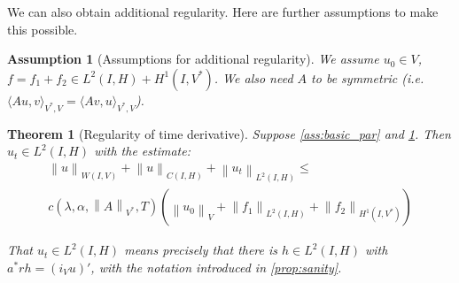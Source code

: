 \documentclass[english,a4paper,10pt,oneside]{scrbook}	%
\theoremstyle{break}
\newtheorem{thm}[equation]{Theorem}
\newtheorem{ass}[equation]{Assumption}
\theoremstyle{remark}
\newcommand{\norm}[1]{\left\lVert#1\right\rVert}
\newcommand{\VN}[1]{\norm{#1}_{V}}
\newcommand{\VSN}[1]{\norm{#1}_{V^*}}
\begin{document}
We can also obtain additional regularity. Here are further assumptions to make this possible.

\begin{ass}[Assumptions for additional regularity]
\label{ass:reg_par}
We assume $u_0 \in V$, $f = f_1+f_2 \in L^2(I,H)+H^1(I,V^*)$. We also need $A$ to be symmetric (i.e. $\langle Au,v \rangle_{V^*,V} = \langle Av,u \rangle_{V^*,V}$).
\end{ass}

\begin{thm}[Regularity of time derivative]
\label{thm:reg_time}
Suppose \cref{ass:basic_par} and \cref{ass:reg_par}. Then $u_t \in L^2(I, H)$ with the estimate:
\begin{align}
	\norm{u}_{W(I,V)} + \norm{u}_{C(I,H)} + \norm{u_t}_{L^2(I,H)} \leq\\ c(\lambda, \alpha, \VSN{A}, T)(\VN{u_0}+\norm{f_1}_{L^2(I,H)} + \norm{f_2}_{H^1(I,V^*)})
\end{align}

That $u_t \in L^2(I, H)$ means precisely that there is $h \in L^2(I,H)$ with $a^* r h = (i_V u)'$, with the notation introduced in \cref{prop:sanity}.

\end{thm}
\end{document}
